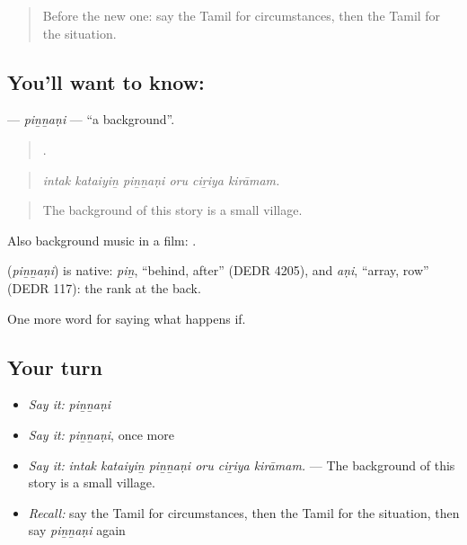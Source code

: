 \label{lesson:TA-C385-pinnani}



\begin{quote}
Before the new one: say the Tamil for circumstances, then the Tamil for the situation.
\end{quote}

\subsection*{You'll want to know: }
\textbf{} — \emph{piṉṉaṇi} — \textquotedblleft{}a background\textquotedblright{}.

\begin{quote}
     .
\end{quote}

\begin{quote}
\emph{intak kataiyiṉ piṉṉaṇi oru ciṟiya kirāmam.}
\end{quote}

\begin{quote}
The background of this story is a small village.
\end{quote}

Also background music in a film:  .

\begin{cousinweb}
\textbf{} (\emph{piṉṉaṇi}) is native: \emph{piṉ}, \textquotedblleft{}behind, after\textquotedblright{} (DEDR 4205), and \emph{aṇi}, \textquotedblleft{}array, row\textquotedblright{} (DEDR 117): the rank at the back.
\end{cousinweb}

\begin{grammarlens}[title={What you've built}]
One more word for saying what happens if.
\end{grammarlens}

\subsection*{Your turn}
\begin{itemize}
\raggedright
  \item \emph{Say it:} \emph{piṉṉaṇi}
  \item \emph{Say it:} \emph{piṉṉaṇi}, once more
  \item \emph{Say it:} \emph{intak kataiyiṉ piṉṉaṇi oru ciṟiya kirāmam.} — The background of this story is a small village.
  \item \emph{Recall:} say the Tamil for circumstances, then the Tamil for the situation, then say \emph{piṉṉaṇi} again
\end{itemize}

